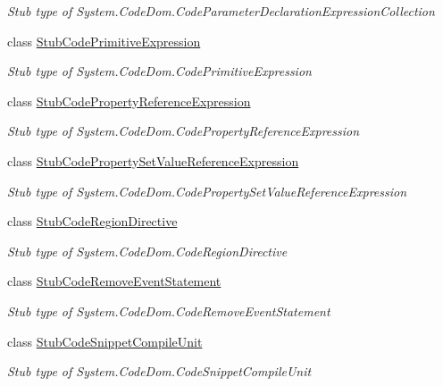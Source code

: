 \begin{DoxyCompactItemize}
\begin{DoxyCompactList}\small\item\em Stub type of System.\-Code\-Dom.\-Code\-Parameter\-Declaration\-Expression\-Collection\end{DoxyCompactList}\item 
class \hyperlink{class_system_1_1_code_dom_1_1_fakes_1_1_stub_code_primitive_expression}{Stub\-Code\-Primitive\-Expression}
\begin{DoxyCompactList}\small\item\em Stub type of System.\-Code\-Dom.\-Code\-Primitive\-Expression\end{DoxyCompactList}\item 
class \hyperlink{class_system_1_1_code_dom_1_1_fakes_1_1_stub_code_property_reference_expression}{Stub\-Code\-Property\-Reference\-Expression}
\begin{DoxyCompactList}\small\item\em Stub type of System.\-Code\-Dom.\-Code\-Property\-Reference\-Expression\end{DoxyCompactList}\item 
class \hyperlink{class_system_1_1_code_dom_1_1_fakes_1_1_stub_code_property_set_value_reference_expression}{Stub\-Code\-Property\-Set\-Value\-Reference\-Expression}
\begin{DoxyCompactList}\small\item\em Stub type of System.\-Code\-Dom.\-Code\-Property\-Set\-Value\-Reference\-Expression\end{DoxyCompactList}\item 
class \hyperlink{class_system_1_1_code_dom_1_1_fakes_1_1_stub_code_region_directive}{Stub\-Code\-Region\-Directive}
\begin{DoxyCompactList}\small\item\em Stub type of System.\-Code\-Dom.\-Code\-Region\-Directive\end{DoxyCompactList}\item 
class \hyperlink{class_system_1_1_code_dom_1_1_fakes_1_1_stub_code_remove_event_statement}{Stub\-Code\-Remove\-Event\-Statement}
\begin{DoxyCompactList}\small\item\em Stub type of System.\-Code\-Dom.\-Code\-Remove\-Event\-Statement\end{DoxyCompactList}\item 
class \hyperlink{class_system_1_1_code_dom_1_1_fakes_1_1_stub_code_snippet_compile_unit}{Stub\-Code\-Snippet\-Compile\-Unit}
\begin{DoxyCompactList}\small\item\em Stub type of System.\-Code\-Dom.\-Code\-Snippet\-Compile\-Unit\end{DoxyCompactList}\item 

\end{DoxyCompactItemize}
